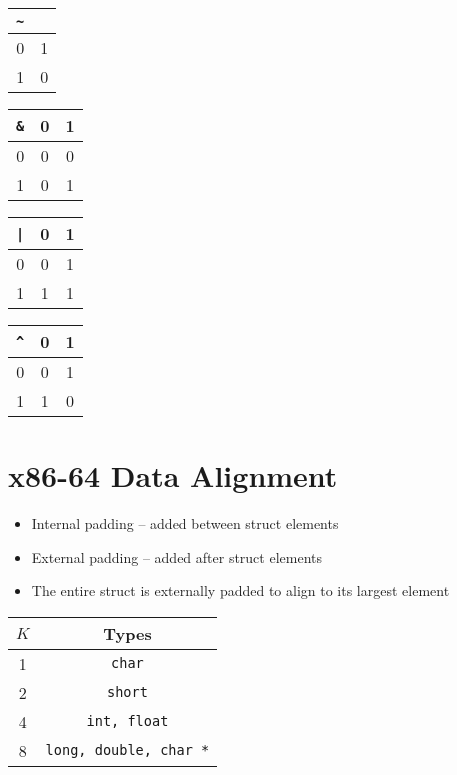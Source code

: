 \documentclass[twocolumn]{article}
\renewcommand{\tt}[1]{\texttt{#1}}
\begin{document}
\begin{multicols}{4}
    \begin{tabular}{r | c}
        \tt{\~} & \\ \hline
        0 & 1 \\
        1 & 0
    \end{tabular}
    \begin{tabular}{r | c c}
        \tt{\&} & 0 & 1 \\ \hline
        0 & 0 & 0 \\
        1 & 0 & 1
    \end{tabular}
    \begin{tabular}{r | c c}
        \tt{|} & 0 & 1 \\ \hline
        0 & 0 & 1 \\
        1 & 1 & 1
    \end{tabular}
    \begin{tabular}{r | c c}
        \tt{\^} & 0 & 1 \\ \hline
        0 & 0 & 1 \\
        1 & 1 & 0
    \end{tabular}
\end{multicols}

\vfill
\pagebreak

\section{x86-64 Data Alignment}
\begin{itemize}[noitemsep]
    \item Internal padding -- added between struct elements
    \item External padding -- added after struct elements
    \item The entire struct is externally padded to align to its largest element
\end{itemize}

\begin{tabular}{| c || c |} \hline
    $K$ & Types \\ \hline
    1 & \tt{char} \\ \hline
    2 & \tt{short} \\ \hline
    4 & \tt{int, float} \\ \hline
    8 & \tt{long, double, char *} \\ \hline
\end{tabular}

\vfill
\end{document}
